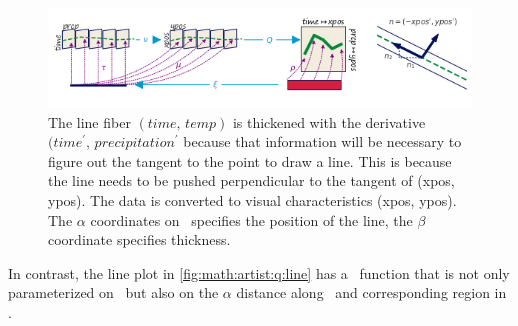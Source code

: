 \documentclass[../main.tex]{subfiles}
\begin{document}
\begin{figure}[H]
    \includegraphics[width=\textwidth]{figures/math/line_with_s.png}
    \caption{The line fiber $(time,\, temp)$ is thickened with the derivative $(time^{\prime},\, precipitation^{\prime}$ because that information will be necessary to figure out the tangent to the point to draw a line. This is because the line needs to be pushed perpendicular to the tangent of (xpos, ypos). The data is converted to visual characteristics (xpos, ypos). The $\alpha$ coordinates on \gbase\ specifies the position of the line, the $\beta$ coordinate specifies thickness.}
    \label{fig:math:artist:q:line}
\end{figure}
In contrast, the line plot in \autoref{fig:math:artist:q:line} has a \vindex\ function that is not only parameterized on \dbasepoint\ but also on the $\alpha$ distance along \dbasepoint\ and corresponding region in \gbase. 
\end{document}
